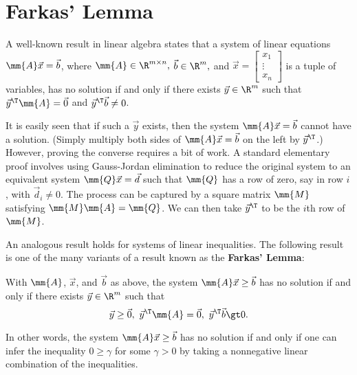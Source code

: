 %

\section{Farkas' Lemma}\label{farkas-lemma}

A well-known result in linear algebra states that a system of linear
equations \(\mm{A}\vec{x} = \vec{b}\), where
\(\mm{A} \in \R^{m\times n},\) \(\vec{b}\in \R^m,\) and
\(\vec{x} = \begin{bmatrix} x_1\\ \vdots \\ x_n\end{bmatrix}\) is a
tuple of variables, has no solution if and only if there exists
\(\vec{y} \in \R^m\) such that \(\vec{y}^\T\mm{A} = \vec{0}\) and
\(\vec{y}^\T \vec{b} \neq 0\).

It is easily seen that if such a \(\vec{y}\) exists, then the system
\(\mm{A}\vec{x} = \vec{b}\) cannot have a solution. (Simply multiply
both sides of \(\mm{A}\vec{x} = \vec{b}\) on the left by
\(\vec{y}^\T\).) However, proving the converse requires a bit of work. A
standard elementary proof involves using Gauss-Jordan elimination to
reduce the original system to an equivalent system
\(\mm{Q}\vec{x} = \vec{d}\) such that \(\mm{Q}\) has a row of zero, say
in row \(i\), with \(\vec{d}_i \neq 0\). The process can be captured by
a square matrix \(\mm{M}\) satisfying \(\mm{M}\mm{A} = \mm{Q}\). We can
then take \(\vec{y}^\T\) to be the \(i\)th row of \(\mm{M}\).

An analogous result holds for systems of linear inequalities. The
following result is one of the many variants of a result known as the
\textbf{Farkas' Lemma}:

\begin{theorem}{}{}
\protect\hypertarget{thm:farkas}{}{\label{thm:farkas}}With \(\mm{A}\),
\(\vec{x}\), and \(\vec{b}\) as above, the system
\(\mm{A}\vec{x} \geq \vec{b}\) has no solution if and only if there
exists \(\vec{y} \in \R^m\) such that
\[\vec{y} \geq \vec{0},~\vec{y}^\T \mm{A} = \vec{0},~
\vec{y}^\T\vec{b} \gt 0.\]
\end{theorem}

In other words, the system \(\mm{A}\vec{x} \geq \vec{b}\) has no
solution if and only if one can infer the inequality \(0 \geq \gamma\)
for some \(\gamma \gt 0\) by taking a nonnegative linear combination of
the inequalities.

